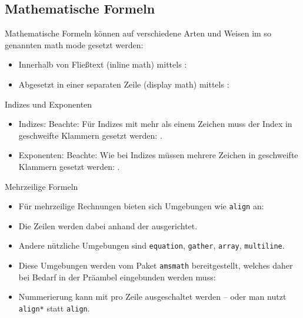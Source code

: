 \subsection{Mathematische Formeln}

\begin{frame}[fragile]{\subsecname}
    Mathematische Formeln können auf verschiedene Arten und Weisen im so genannten \alert{math mode}
    gesetzt werden:
    \begin{itemize}
        \item Innerhalb von Fließtext (\alert{inline math}) mittels :
        \item Abgesetzt in einer separaten Zeile (\alert{display math}) mittels \code{[...]}:
    \end{itemize}
\end{frame}

\begin{frame}[fragile]{Indizes und Exponenten}
    \begin{itemize}
        \item Indizes:
            Beachte: Für Indizes mit mehr als einem Zeichen muss der Index in geschweifte Klammern
            gesetzt werden: .
        \item Exponenten:
            Beachte: Wie bei Indizes müssen mehrere Zeichen in geschweifte Klammern gesetzt werden:
            .
    \end{itemize}
\end{frame}

\begin{frame}[fragile]{Mehrzeilige Formeln}
    \begin{itemize}
        \item Für mehrzeilige Rechnungen bieten sich Umgebungen wie \texttt{align} an:
        \item Die Zeilen werden dabei anhand der \code{&} ausgerichtet.
        \item Andere nützliche Umgebungen sind \texttt{equation}, \texttt{gather}, \texttt{array},
            \texttt{multiline}.
        \item Diese Umgebungen werden vom Paket \texttt{amsmath} bereitgestellt, welches daher bei
            Bedarf in der Präambel eingebunden werden muss:
            \begin{center}
                \code{\usepackage{amsmath}}
            \end{center}
        \item Nummerierung kann mit \code{\nonumber} pro Zeile ausgeschaltet werden -- oder man
            nutzt \texttt{align*} statt \texttt{align}.
    \end{itemize}
\end{frame}

